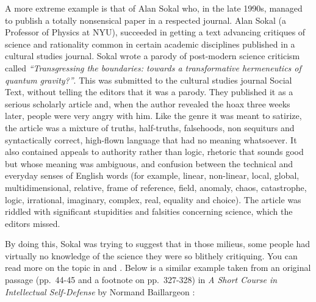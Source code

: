 \documentclass[graybox,envcountchap,sectrefs,UStrade]{svmono}
\begin{document}
A more extreme example is that of Alan Sokal who, in the late 1990s, managed to publish a totally nonsensical paper in a respected journal. Alan Sokal (a Professor of Physics at NYU), succeeded in getting a text advancing critiques of science and rationality common in certain academic disciplines published in a cultural studies journal. Sokal wrote a parody of post-modern science criticism called \emph{``Transgressing the boundaries: towards a transformative hermeneutics of quantum gravity?''}. This was submitted to the cultural studies journal Social Text, without telling the editors that it was a parody. They published it as a serious scholarly article and, when the author revealed the hoax three weeks later, people were very angry with him. Like the genre it was meant to satirize, the article was a mixture of truths, half-truths, falsehoods, non sequiturs and syntactically correct, high-flown language that had no meaning whatsoever. It also contained appeals to authority rather than logic, rhetoric that sounds good but whose meaning was ambiguous, and confusion between the technical and everyday senses of English words (for example, linear, non-linear, local, global, multidimensional, relative, frame of reference, field, anomaly, chaos, catastrophe, logic, irrational, imaginary, complex, real, equality and choice). The article was riddled with significant stupidities and falsities concerning science, which the editors missed.\par

By doing this, Sokal was trying to suggest that in those milieus, some people had virtually no knowledge of the science they were so blithely critiquing. You can read more on the topic in \citet{SokalBricmont1997} and \citet{Sokal1998S}. Below is a similar example taken from an original passage (pp.~44-45 and a footnote on pp.~327-328) in \emph{A Short Course in Intellectual Self-Defense} by Normand Baillargeon  \citep{Baillargeon2008short}: \par
\end{document}
